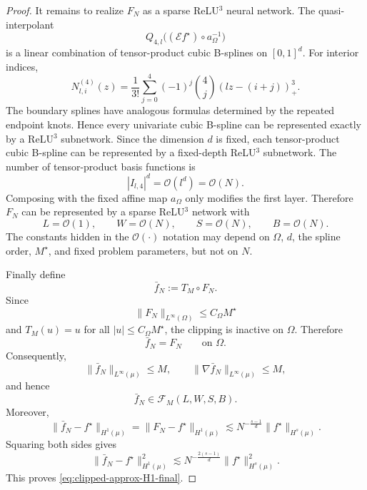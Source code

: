 \documentclass[10pt,a4paper]{amsart}
\begin{document}
\begin{proof}
It remains to realize \(F_N\) as a sparse ReLU\(^3\) neural network. The
quasi-interpolant
\[
Q_{4,l}\bigl((\mathcal E f^\star)\circ a_\Omega^{-1}\bigr)
\]
is a linear combination of tensor-product cubic B-splines on \([0,1]^d\).
For interior indices,
\[
N_{l,i}^{(4)}(z)
=
\frac{1}{3!}
\sum_{j=0}^{4}
(-1)^j
\binom{4}{j}
\left(lz-(i+j)\right)_+^3 .
\]
The boundary splines have analogous formulas determined by the repeated
endpoint knots. Hence every univariate cubic B-spline can be represented
exactly by a ReLU\(^3\) subnetwork. Since the dimension \(d\) is fixed,
each tensor-product cubic B-spline can be represented by a fixed-depth
ReLU\(^3\) subnetwork. The number of tensor-product basis functions is
\[
|I_{l,4}|^d=\mathcal O(l^d)=\mathcal O(N).
\]
Composing with the fixed affine map \(a_\Omega\) only modifies the first layer.
Therefore \(F_N\) can be represented by a sparse ReLU\(^3\) network with
\[
L=\mathcal O(1),
\qquad
W=\mathcal O(N),
\qquad
S=\mathcal O(N),
\qquad
B=\mathcal O(N).
\]
The constants hidden in the \(\mathcal O(\cdot)\) notation may depend on
\(\Omega\), \(d\), the spline order, \(M^\star\), and fixed problem
parameters, but not on \(N\).

Finally define
\[
\bar f_N:=T_M\circ F_N .
\]
Since
\[
\|F_N\|_{L^\infty(\Omega)}\le C_\Omega M^\star
\]
and \(T_M(u)=u\) for all \(|u|\le C_\Omega M^\star\), the clipping is inactive
on \(\Omega\). Therefore
\[
\bar f_N=F_N
\qquad\text{on }\Omega .
\]
Consequently,
\[
\|\bar f_N\|_{L^\infty(\mu)}\le M,
\qquad
\|\nabla \bar f_N\|_{L^\infty(\mu)}\le M,
\]
and hence
\[
\bar f_N\in\mathcal F_M(L,W,S,B).
\]
Moreover,
\[
\|\bar f_N-f^\star\|_{H^1(\mu)}
=
\|F_N-f^\star\|_{H^1(\mu)}
\lesssim
N^{-\frac{s-1}{d}}
\|f^\star\|_{H^s(\mu)}.
\]
Squaring both sides gives
\[
\|\bar f_N-f^\star\|_{H^1(\mu)}^2
\lesssim
N^{-\frac{2(s-1)}{d}}
\|f^\star\|_{H^s(\mu)}^2 .
\]
This proves \eqref{eq:clipped-approx-H1-final}.
\end{proof}
\end{document}

